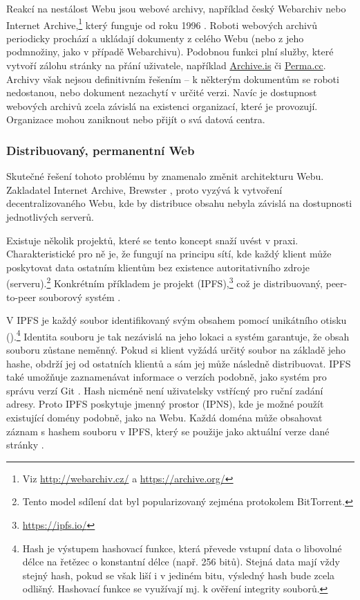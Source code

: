 Reakcí na nestálost Webu jsou webové archivy, například český Webarchiv nebo Internet Archive,\footnote{Viz \url{http://webarchiv.cz/} a \url{https://archive.org/}} který funguje od roku 1996 \autocite{LaFrance2015}. Roboti webových archivů periodicky prochází a ukládají dokumenty z celého Webu (nebo z jeho podmnožiny, jako v případě Webarchivu). Podobnou funkci plní služby, které vytvoří zálohu stránky na přání uživatele, například \href{https://archive.is/}{Archive.is} či \href{https://perma.cc/}{Perma.cc}. Archivy však nejsou definitivním řešením -- k některým dokumentům se roboti nedostanou, nebo dokument nezachytí v určité verzi. Navíc je dostupnost webových archivů zcela závislá na existenci organizací, které je provozují. Organizace mohou zaniknout nebo přijít o svá datová centra.

\subsubsection{Distribuovaný, permanentní Web}

Skutečné řešení tohoto problému by znamenalo změnit architekturu Webu. Zakladatel Internet Archive, Brewster \textcite{Kahle2015}, proto vyzývá k vytvoření decentralizovaného Webu, kde by distribuce obsahu nebyla závislá na dostupnosti jednotlivých serverů.

Existuje několik projektů, které se tento koncept snaží uvést v praxi.
Charakteristické pro ně je, že fungují na principu  sítí, kde každý klient může poskytovat data ostatním klientům bez existence autoritativního zdroje (serveru).\footnote{Tento model sdílení dat byl popularizovaný zejména protokolem BitTorrent.} 
Konkrétním příkladem je projekt  (IPFS),\footnote{\url{https://ipfs.io/}} což je distribuovaný, peer-to-peer souborový systém \autocite{IPFS}.

V IPFS je každý soubor identifikovaný svým obsahem pomocí unikátního otisku ().\footnote{Hash je výstupem hashovací funkce, která převede vstupní data o libovolné délce na řetězec o konstantní délce (např. 256 bitů). Stejná data mají vždy stejný hash, pokud se však liší i v jediném bitu, výsledný hash bude zcela odlišný. Hashovací funkce se využívají mj. k ověření integrity souborů.}
Identita souboru je tak nezávislá na jeho lokaci a systém garantuje, že obsah souboru zůstane neměnný. Pokud si klient vyžádá určitý soubor na základě jeho hashe, obdrží jej od ostatních klientů a sám jej může následně distribuovat. IPFS také umožňuje zaznamenávat informace o verzích podobně, jako systém pro správu verzí Git \autocite[3.6]{IPFS}. Hash nicméně není uživatelsky vstřícný pro ruční zadání adresy. Proto IPFS poskytuje jmenný prostor  (IPNS),
kde je možné použít existující domény podobně, jako na Webu. Každá doména může obsahovat záznam s hashem souboru v IPFS, který se použije jako aktuální verze dané stránky \autocite[3.7]{IPFS}.

